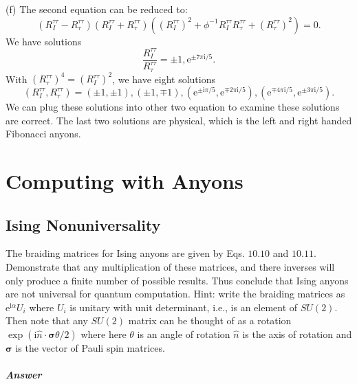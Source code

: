 \documentclass{book}
\begin{document}
(f) The second equation can be reduced to:
\begin{equation*}
(R_{I}^{\tau \tau } -R_{\tau }^{\tau \tau } )(R_{I}^{\tau \tau } +R_{\tau }^{\tau \tau } )((R_{I}^{\tau \tau } )^{2} +\phi ^{-1} R_{I}^{\tau \tau } R_{\tau }^{\tau \tau } +(R_{\tau }^{\tau \tau } )^{2} )=0.
\end{equation*}
We have solutions
\begin{equation*}
\frac{R_{I}^{\tau \tau }}{R_{\tau }^{\tau \tau }} =\pm 1,\mathrm{e}^{\pm 7\pi \mathrm{i} /5} .
\end{equation*}
With $(R_{\tau }^{\tau \tau } )^{4} =(R_{I}^{\tau \tau } )^{2}$, we have eight solutions
\begin{equation*}
(R_{I}^{\tau \tau } ,R_{\tau }^{\tau \tau } )=(\pm 1,\pm 1),(\pm 1,\mp 1),(\mathrm{e}^{\pm \mathrm{i} \pi /5} ,\mathrm{e}^{\mp 2\pi \mathrm{i} /5} ),(\mathrm{e}^{\mp 4\pi \mathrm{i} /5} ,\mathrm{e}^{\pm 3\pi \mathrm{i} /5} ).
\end{equation*}
We can plug these solutions into other two equation to examine these solutions are correct. The last two solutions are physical, which is the left and right handed Fibonacci anyons. 

\chapter{Computing with Anyons}
\section{Ising Nonuniversality}
The braiding matrices for Ising anyons are given by Eqs. $10.10$ and $10.11$. Demonstrate that any multiplication of these matrices, and there inverses will only produce a finite number of possible results. Thus conclude that Ising anyons are not universal for quantum computation. Hint: write the braiding matrices as $\mathrm{e}^{\mathrm{i} \alpha } U_{i}$ where $U_{i}$ is unitary with unit determinant, i.e., is an element of $SU(2)$. Then note that any $SU(2)$ matrix can be thought of as a rotation $\exp (\mathrm{i}\hat{n} \cdot \boldsymbol{\sigma } \theta /2)$ where here $\theta $ is an angle of rotation $\hat{n}$ is the axis of rotation and $\boldsymbol{\sigma }$ is the vector of Pauli spin matrices.

\paragraph{Answer}
\end{document}
